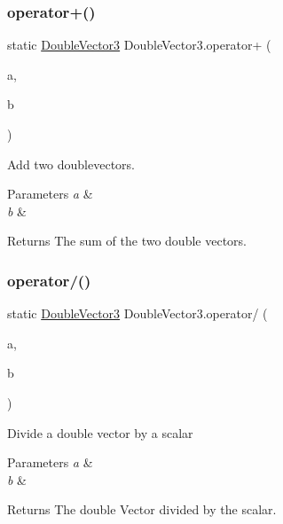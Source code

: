 \subsubsection{\texorpdfstring{operator+()}{operator+()}}
{\footnotesize\ttfamily static \mbox{\hyperlink{class_double_vector3}{Double\+Vector3}} Double\+Vector3.\+operator+ (\begin{DoxyParamCaption}\item[{\mbox{\hyperlink{class_double_vector3}{Double\+Vector3}}}]{a,  }\item[{\mbox{\hyperlink{class_double_vector3}{Double\+Vector3}}}]{b }\end{DoxyParamCaption})\hspace{0.3cm}{\ttfamily [static]}}



Add two doublevectors. 


\begin{DoxyParams}{Parameters}
{\em a} & \\
\hline
{\em b} & \\
\hline
\end{DoxyParams}
\begin{DoxyReturn}{Returns}
The sum of the two double vectors.
\end{DoxyReturn}
\mbox{\label{class_double_vector3_a069bc62ef684c5ed1bfca92ec0820932}} 
\subsubsection{\texorpdfstring{operator/()}{operator/()}\hspace{0.1cm}{\footnotesize\ttfamily [1/2]}}
{\footnotesize\ttfamily static \mbox{\hyperlink{class_double_vector3}{Double\+Vector3}} Double\+Vector3.\+operator/ (\begin{DoxyParamCaption}\item[{\mbox{\hyperlink{class_double_vector3}{Double\+Vector3}}}]{a,  }\item[{double}]{b }\end{DoxyParamCaption})\hspace{0.3cm}{\ttfamily [static]}}



Divide a double vector by a scalar 


\begin{DoxyParams}{Parameters}
{\em a} & \\
\hline
{\em b} & \\
\hline
\end{DoxyParams}
\begin{DoxyReturn}{Returns}
The double Vector divided by the scalar.
\end{DoxyReturn}
\mbox{\label{class_double_vector3_aacc1881f47ec834f4bcf25b84a1fe8de}} 
